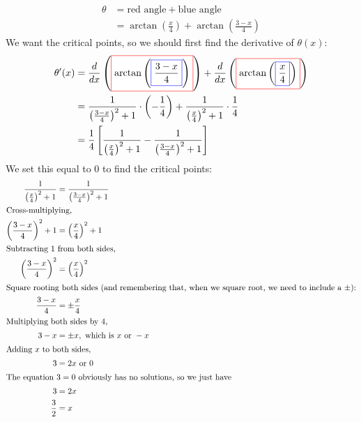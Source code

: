 \documentclass{article}
\begin{document}
\begin{enumerate}
{\begin{solution}
      \begin{align*}
        \theta &= \text{red angle} + \text{blue angle} \\
        &= \arctan \left(
          \frac{x}{4} \right)  + \arctan \left( \frac{3 - x}{4} \right) 
      \end{align*}
        We want the critical points, so
      we should first find the derivative of $\theta(x)$:
      \begin{align*}
        \theta'(x) 
        &= \frac{d}{dx} \left(\fcolorbox{red}{white}{$\displaystyle
            \arctan\left(\fcolorbox{blue}{white}{$\displaystyle \frac{3 -
                  x}{4}$}\right)$}\right)+ \frac{d}{dx}
        \left(\fcolorbox{red}{white}{$\displaystyle
            \arctan\left(\fcolorbox{blue}{white}{$\displaystyle
                \frac{x}{4}$}\right)$}\right) \\      
        &= \frac{1}{\left(\frac{3 - x}{4}\right)^2+1}\cdot \left( -
          \frac{1}{4} \right) + \frac{1}{\left(\frac{x}{4}\right)^2+1}\cdot
        \frac{1}{4} \\
        &= \frac{1}{4} \left[ \frac{1}{\left(\frac{x}{4}\right)^2+1} -
          \frac{1}{\left(\frac{3 - x}{4}\right)^2+1} \right]
      \end{align*}
      We set this equal to 0 to find the critical points:    
      \begin{align*}
        \frac{1}{\left(\frac{x}{4}\right)^2+1} &= \frac{1}{\left(\frac{3 -
              x}{4}\right)^2+1} \\
        \shortintertext{Cross-multiplying,} %
        \left(\frac{3 - x}{4}\right)^2+1
        &=\left(\frac{x}{4}\right)^2+1 \\
        \intertext{Subtracting 1 from both sides,} \left(\frac{3 -
            x}{4}\right)^2 &= \left(\frac{x}{4}\right)^2 \\
        \intertext{Square rooting both sides (and remembering that, when we
          square root, we need to include a $\pm$):}%
        \frac{3 - x}{4} &= \pm \frac{x}{4} \\
        \intertext{Multiplying both sides by 4,}%
        3 - x &= \pm x, \text{ which is } x \text{ or } -x \\
        \intertext{Adding $x$ to both sides,}
        3 &= 2x \text{ or 0} \\
        \intertext{The equation $3 = 0$ obviously has no solutions, so we
          just have}
        3 &= 2x \\
        \frac{3}{2} &= x 
      \end{align*}    


\end{solution}}
\end{enumerate}
\end{document}
